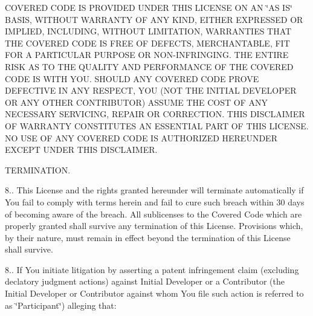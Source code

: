 \begin{DoxyEnumerate}
C\-O\-V\-E\-R\-E\-D C\-O\-D\-E I\-S P\-R\-O\-V\-I\-D\-E\-D U\-N\-D\-E\-R T\-H\-I\-S L\-I\-C\-E\-N\-S\-E O\-N A\-N \char`\"{}\-A\-S I\-S\char`\"{} B\-A\-S\-I\-S, W\-I\-T\-H\-O\-U\-T W\-A\-R\-R\-A\-N\-T\-Y O\-F A\-N\-Y K\-I\-N\-D, E\-I\-T\-H\-E\-R E\-X\-P\-R\-E\-S\-S\-E\-D O\-R I\-M\-P\-L\-I\-E\-D, I\-N\-C\-L\-U\-D\-I\-N\-G, W\-I\-T\-H\-O\-U\-T L\-I\-M\-I\-T\-A\-T\-I\-O\-N, W\-A\-R\-R\-A\-N\-T\-I\-E\-S T\-H\-A\-T T\-H\-E C\-O\-V\-E\-R\-E\-D C\-O\-D\-E I\-S F\-R\-E\-E O\-F D\-E\-F\-E\-C\-T\-S, M\-E\-R\-C\-H\-A\-N\-T\-A\-B\-L\-E, F\-I\-T F\-O\-R A P\-A\-R\-T\-I\-C\-U\-L\-A\-R P\-U\-R\-P\-O\-S\-E O\-R N\-O\-N-\/\-I\-N\-F\-R\-I\-N\-G\-I\-N\-G. T\-H\-E E\-N\-T\-I\-R\-E R\-I\-S\-K A\-S T\-O T\-H\-E Q\-U\-A\-L\-I\-T\-Y A\-N\-D P\-E\-R\-F\-O\-R\-M\-A\-N\-C\-E O\-F T\-H\-E C\-O\-V\-E\-R\-E\-D C\-O\-D\-E I\-S W\-I\-T\-H Y\-O\-U. S\-H\-O\-U\-L\-D A\-N\-Y C\-O\-V\-E\-R\-E\-D C\-O\-D\-E P\-R\-O\-V\-E D\-E\-F\-E\-C\-T\-I\-V\-E I\-N A\-N\-Y R\-E\-S\-P\-E\-C\-T, Y\-O\-U (N\-O\-T T\-H\-E I\-N\-I\-T\-I\-A\-L D\-E\-V\-E\-L\-O\-P\-E\-R O\-R A\-N\-Y O\-T\-H\-E\-R C\-O\-N\-T\-R\-I\-B\-U\-T\-O\-R) A\-S\-S\-U\-M\-E T\-H\-E C\-O\-S\-T O\-F A\-N\-Y N\-E\-C\-E\-S\-S\-A\-R\-Y S\-E\-R\-V\-I\-C\-I\-N\-G, R\-E\-P\-A\-I\-R O\-R C\-O\-R\-R\-E\-C\-T\-I\-O\-N. T\-H\-I\-S D\-I\-S\-C\-L\-A\-I\-M\-E\-R O\-F W\-A\-R\-R\-A\-N\-T\-Y C\-O\-N\-S\-T\-I\-T\-U\-T\-E\-S A\-N E\-S\-S\-E\-N\-T\-I\-A\-L P\-A\-R\-T O\-F T\-H\-I\-S L\-I\-C\-E\-N\-S\-E. N\-O U\-S\-E O\-F A\-N\-Y C\-O\-V\-E\-R\-E\-D C\-O\-D\-E I\-S A\-U\-T\-H\-O\-R\-I\-Z\-E\-D H\-E\-R\-E\-U\-N\-D\-E\-R E\-X\-C\-E\-P\-T U\-N\-D\-E\-R T\-H\-I\-S D\-I\-S\-C\-L\-A\-I\-M\-E\-R.
\item T\-E\-R\-M\-I\-N\-A\-T\-I\-O\-N.

8.. This License and the rights granted hereunder will terminate automatically if You fail to comply with terms herein and fail to cure such breach within 30 days of becoming aware of the breach. All sublicenses to the Covered Code which are properly granted shall survive any termination of this License. Provisions which, by their nature, must remain in effect beyond the termination of this License shall survive.

8.. If You initiate litigation by asserting a patent infringement claim (excluding declatory judgment actions) against Initial Developer or a Contributor (the Initial Developer or Contributor against whom You file such action is referred to as \char`\"{}\-Participant\char`\"{}) alleging that\-:


\end{DoxyEnumerate}

